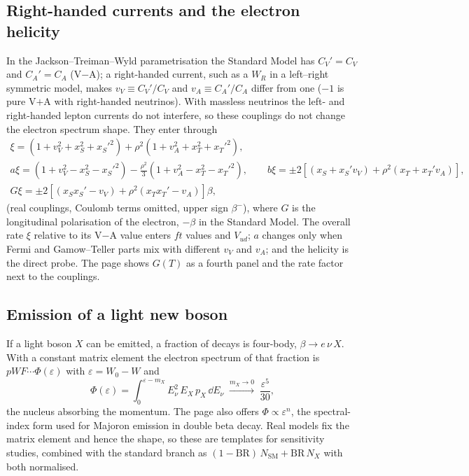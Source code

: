 \subsection{Right-handed currents and the electron helicity}
\label{sec:rh}
In the Jackson--Treiman--Wyld parametrisation the Standard Model has $C_V' = C_V$ and $C_A' = C_A$ (V$-$A); a right-handed current, such as a $W_R$ in a left--right symmetric model, makes $v_V \equiv C_V'/C_V$ and $v_A \equiv C_A'/C_A$ differ from one ($-1$ is pure V$+$A with right-handed neutrinos). With massless neutrinos the left- and right-handed lepton currents do not interfere, so these couplings do not change the electron spectrum shape. They enter through
\begin{gather}
\xi = (1 + v_V^2 + x_S^2 + x_S'^2) + \rho^2(1 + v_A^2 + x_T^2 + x_T'^2),\\
a\xi = (1 + v_V^2 - x_S^2 - x_S'^2) - \tfrac{\rho^2}{3}(1 + v_A^2 - x_T^2 - x_T'^2),\qquad
b\xi = \pm 2\left[(x_S + x_S' v_V) + \rho^2(x_T + x_T' v_A)\right],\nonumber\\
G\xi = \pm 2\left[(x_S x_S' - v_V) + \rho^2(x_T x_T' - v_A)\right]\beta,\nonumber
\end{gather}
(real couplings, Coulomb terms omitted, upper sign $\beta^-$), where $G$ is the longitudinal polarisation of the electron, $-\beta$ in the Standard Model. The overall rate $\xi$ relative to its V$-$A value enters $ft$ values and $V_{ud}$; $a$ changes only when Fermi and Gamow--Teller parts mix with different $v_V$ and $v_A$; and the helicity is the direct probe. The page shows $G(T)$ as a fourth panel and the rate factor next to the couplings.

\subsection{Emission of a light new boson}
If a light boson $X$ can be emitted, a fraction of decays is four-body, $\beta\to e\,\nu\,X$. With a constant matrix element the electron spectrum of that fraction is $pW F\cdots\Phi(\varepsilon)$ with $\varepsilon = W_0 - W$ and
\begin{equation}
\Phi(\varepsilon) = \int_0^{\varepsilon - m_X} E_\nu^2\,E_X\,p_X\,\dd E_\nu \;\xrightarrow{m_X\to0}\; \frac{\varepsilon^5}{30},
\end{equation}
the nucleus absorbing the momentum. The page also offers $\Phi\propto\varepsilon^n$, the spectral-index form used for Majoron emission in double beta decay. Real models fix the matrix element and hence the shape, so these are templates for sensitivity studies, combined with the standard branch as $(1 - \mathrm{BR})\,N_\text{SM} + \mathrm{BR}\,N_X$ with both normalised.

